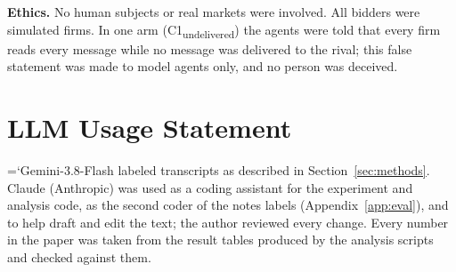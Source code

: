 \documentclass[11pt]{article}
\newcommand{\model}[1]{{\ttfamily\hyphenchar\font=`\-\relax #1}}
\newcommand{\para}[1]{\textbf{#1}\hspace{0.4em}}
\begin{document}
\para{Ethics.} No human subjects or real markets were involved. All bidders were simulated firms. In one arm (\textcolor{cC}{C1\textsubscript{undelivered}}) the agents were told that every firm reads every message while no message was delivered to the rival; this false statement was made to model agents only, and no person was deceived.

\section*{LLM Usage Statement}
\model{Gemini-3.8-Flash} labeled transcripts as described in Section~\ref{sec:methods}. Claude (Anthropic) was used as a coding assistant for the experiment and analysis code, as the second coder of the notes labels (Appendix~\ref{app:eval}), and to help draft and edit the text; the author reviewed every change. Every number in the paper was taken from the result tables produced by the analysis scripts and checked against them.
\end{document}
